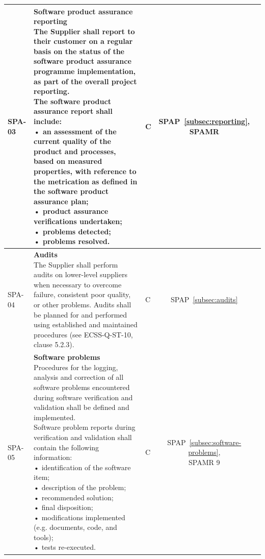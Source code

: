 {\begin{xltabular}{\textwidth}{|l|L|l|S|S|}
        SPA-03 &
        {\textbf{Software product assurance reporting} \newline
        The Supplier shall report to their customer on a regular basis on the status of the software product assurance programme implementation, as part of the overall project reporting. \newline
        The software product assurance report shall include: \newline
        • an assessment of the current quality of the product and processes, based on measured properties, with reference to the metrication as defined in the software product assurance plan; \newline
        • product assurance verifications undertaken; \newline
        • problems detected; \newline
        • problems resolved.} &
        C &
        {SPAP~\ref{subsec:reporting}, \newline SPAMR} &
        \\ \hline

        SPA-04 &
        {\textbf{Audits} \newline
        The Supplier shall perform audits on lower-level suppliers when necessary to overcome failure, consistent poor quality, or other problems. Audits shall be planned for and performed using established and maintained procedures (see ECSS-Q-ST-10, clause 5.2.3).} &
        C &
        {SPAP~\ref{subsec:audits}} &
        \\ \hline

        SPA-05 &
        {\textbf{Software problems} \newline
        Procedures for the logging, analysis and correction of all software problems encountered during software verification and validation shall be defined and implemented.  \newline
        Software problem reports during verification and validation shall contain the following information:  \newline
        • identification of the software item;  \newline
        • description of the problem;  \newline
        • recommended solution;  \newline
        • final disposition;  \newline
        • modifications implemented (e.g. documents, code, and tools);  \newline
        • tests re-executed.} &
        C &
        {SPAP~\ref{subsec:software-problems}, \newline SPAMR 9} &
        \\ \hline


\end{xltabular}}
